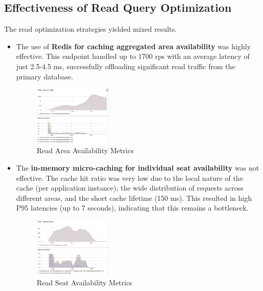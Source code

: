 \subsection{Effectiveness of Read Query Optimization}
The read optimization strategies yielded mixed results.
\begin{itemize}
    \item The use of \textbf{Redis for caching aggregated area availability} was highly effective. This endpoint handled up to 1700 rps with an average latency of just 2.5-4.5 ms, successfully offloading significant read traffic from the primary database.
          \begin{figure}[H]
              \centering
              \includegraphics[width=0.35\textwidth]{resources/chapter-4/latency-area-availability.png}
              \caption{Read Area Availability Metrics}
              \label{fig:latency-get-area}
          \end{figure}

    \item The \textbf{in-memory micro-caching for individual seat availability} was not effective. The cache hit ratio was very low due to the local nature of the cache (per application instance), the wide distribution of requests across different areas, and the short cache lifetime (150 ms). This resulted in high P95 latencies (up to 7 seconds), indicating that this remains a bottleneck.
          \begin{figure}[H]
              \centering
              \includegraphics[width=0.35\textwidth]{resources/chapter-4/latency-seat-availability.png}
              \caption{Read Seat Availability Metrics}
              \label{fig:latency-get-seat}
          \end{figure}
\end{itemize}

